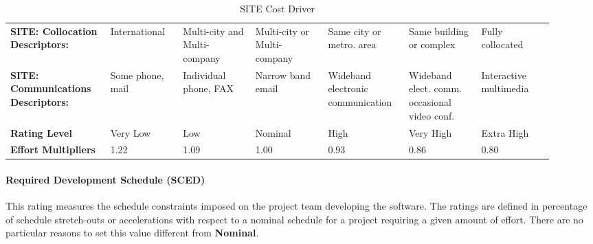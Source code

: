 \begin{table}[H]
	\centering
	\begin{tabular}{|M{0.165\linewidth}|M{0.125\linewidth}|M{0.125\linewidth}|M{0.125\linewidth}|M{0.125\linewidth}|M{0.125\linewidth}|M{0.125\linewidth}|}
		\hline
		\textbf{SITE: Collocation \break Descriptors:} & {\small International} & {\small Multi-city and Multi-company} & {\small Multi-city or Multi-company} & {\small Same city or metro. area} & {\small Same building or complex} & {\small Fully collocated} \\
		\textbf{SITE: Communications \break Descriptors:} & {\small Some phone, mail} & {\small Individual phone, FAX} & {\small Narrow band email} & {\small Wideband electronic communication} & {\small Wideband elect. comm. occasional video conf.} & {\small Interactive multimedia} \\
		\hline
		\textbf{Rating Level} & Very Low & Low & Nominal & High & Very High & Extra High \\
		\hline
		\textbf{Effort Multipliers} & 1.22 & 1.09 & 1.00 & 0.93 & 0.86 & 0.80 \\
		\hline
	\end{tabular}
	\caption{SITE Cost Driver}
\end{table}

\paragraph{Required Development Schedule (SCED)}
This rating measures the schedule constraints imposed on the project team developing the software. The ratings are defined in percentage of schedule stretch-outs or accelerations with respect to a nominal schedule for a project requiring a given amount of effort. There are no particular reasons to set this value different from \textbf{Nominal}.

